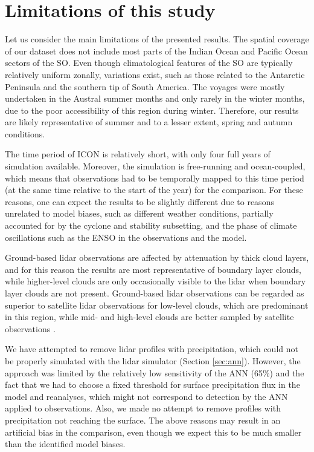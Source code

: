 \documentclass[12pt,a4paper]{article}
\begin{document}
\section{Limitations of this study}

Let us consider the main limitations of the presented results. The spatial
coverage of our dataset does not include most parts of the Indian Ocean and
Pacific Ocean sectors of the SO. Even though climatological features of the SO
are typically relatively uniform zonally, variations exist, such as those
related to the Antarctic Peninsula and the southern tip of South America. The
voyages were mostly undertaken in the Austral summer months and only rarely in
the winter months, due to the poor accessibility of this region during winter.
Therefore, our results are likely representative of summer and to a lesser
extent, spring and autumn conditions.

The time period of ICON is relatively short, with only four full years of
simulation available. Moreover, the simulation is free-running and
ocean-coupled, which means that observations had to be temporally mapped to
this time period (at the same time relative to the start of the year) for the
comparison. For these reasons, one can expect the results to be slightly
different due to reasons unrelated to model biases, such as different weather
conditions, partially accounted for by the cyclone and stability subsetting,
and the phase of climate oscillations such as the ENSO in the observations and
the model.

Ground-based lidar observations are affected by attenuation by thick cloud
layers, and for this reason the results are most representative of boundary
layer clouds, while higher-level clouds are only occasionally visible to the
lidar when boundary layer clouds are not present. Ground-based lidar
observations can be regarded as superior to satellite lidar observations for
low-level clouds, which are predominant in this region, while mid- and
high-level clouds are better sampled by satellite observations
\citep{mcerlich2021}.

We have attempted to remove lidar profiles with precipitation, which could not
be properly simulated with the lidar simulator (Section \ref{sec:ann}).
However, the approach was limited by the relatively low sensitivity of the ANN
(65\%) and the fact that we had to choose a fixed threshold for surface
precipitation flux in the model and reanalyses, which might not correspond to
detection by the ANN applied to observations. Also, we made no attempt to
remove profiles with precipitation not reaching the surface. The above reasons
may result in an artificial bias in the comparison, even though we expect this
to be much smaller than the identified model biases.
\end{document}
